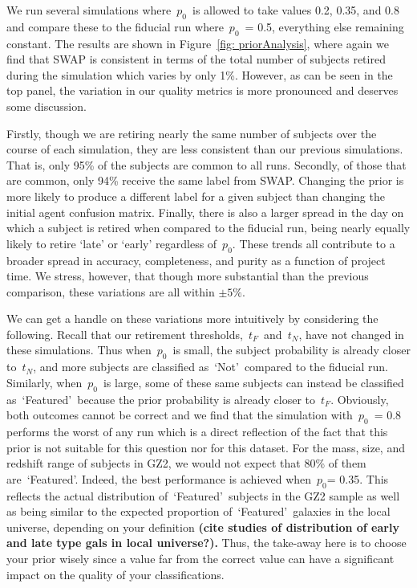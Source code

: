 \documentclass[twocolumn]{aastex6}
\newcommand{\p}{$p_0$}
\newcommand{\tf}{$t_F$}
\newcommand{\tn}{$t_N$}
\newcommand{\feat}{`Featured'}
\newcommand{\notfeat}{`Not'}
\begin{document}
We run several simulations where~\p~is allowed to take values 0.2, 0.35, and 0.8 
and compare these to the fiducial run where~\p~= 0.5, everything else remaining constant.
The results are shown in Figure~\ref{fig: priorAnalysis}, where again we find that 
SWAP is consistent in terms of the total number of subjects retired 
during the simulation which varies by only 1\%. 
However, as can be seen in the top panel, the variation in our quality metrics is 
more pronounced and deserves some discussion. 

Firstly, though we are retiring nearly the same number of subjects over the course
of each simulation, they are less consistent than our previous simulations. That is, 
only 95\% of the subjects are common to all runs. Secondly, of those that are 
common, only 94\% receive the same label from SWAP. Changing the prior is more
likely to produce a different label for a given subject than changing the initial 
agent confusion matrix. Finally, there is also a larger spread in the day on which 
a subject is retired when compared to the fiducial run, being nearly equally likely to 
retire `late' or `early' regardless of~\p. These trends all contribute to a broader 
spread in accuracy, completeness, and purity as a function of project time.
We stress, however, that though more substantial than the previous comparison, 
these variations are all within $\pm5\%$. 

We can get a handle on these variations more intuitively by considering the following.
Recall that our retirement thresholds,~\tf~and~\tn, have not changed in these simulations. 
Thus when~\p~is small, the subject probability is already closer to~\tn, and more 
subjects are classified as~\notfeat~compared to the fiducial run.
Similarly, when~\p~is large, some of these same subjects can instead be classified
as~\feat~because the prior probability is already closer to~\tf. Obviously, both 
outcomes cannot be correct and we find that the simulation with~\p~= 0.8 performs
the worst of any run which is a direct reflection of the fact that this prior is not 
suitable for this question nor for this dataset. For the mass, size, and redshift range
of subjects in GZ2, we would not expect that 80\% of them are~\feat. Indeed, 
the best performance is achieved when~\p = 0.35.  This reflects the actual 
distribution of~\feat~subjects in the GZ2 sample as well as being similar to the 
expected proportion of~\feat~galaxies in the local universe, depending on your
definition\textbf{ (cite studies of distribution of early and late type gals in local universe?). }
Thus, the take-away here is to choose your prior wisely since a value far from the correct
value can have a significant impact on the quality of your classifications.
 
\end{document}
